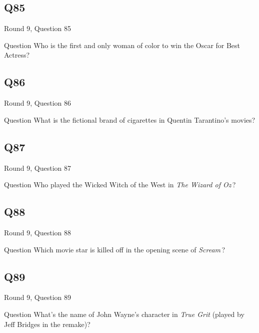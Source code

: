 \documentclass[11pt]{beamer}
\begin{document}
\subsection*{Q85}
\begin{frame}[t]{Round 9, Question 85}
\vspace{2em}
\begin{block}{Question}
Who is the first and only woman of color to win the Oscar for Best Actress?
\end{block}
\end{frame}
    

\subsection*{Q86}
\begin{frame}[t]{Round 9, Question 86}
\vspace{2em}
\begin{block}{Question}
What is the fictional brand of cigarettes in Quentin Tarantino's movies?
\end{block}
\end{frame}
    

\subsection*{Q87}
\begin{frame}[t]{Round 9, Question 87}
\vspace{2em}
\begin{block}{Question}
Who played the Wicked Witch of the West in \emph{The Wizard of Oz}\,?
\end{block}
\end{frame}
    

\subsection*{Q88}
\begin{frame}[t]{Round 9, Question 88}
\vspace{2em}
\begin{block}{Question}
Which movie star is killed off in the opening scene of \emph{Scream}\,?
\end{block}
\end{frame}
    

\subsection*{Q89}
\begin{frame}[t]{Round 9, Question 89}
\vspace{2em}
\begin{block}{Question}
What's the name of John Wayne's character in \emph{True Grit} (played by Jeff Bridges in the remake)?
\end{block}
\end{frame}
    
\end{document}

